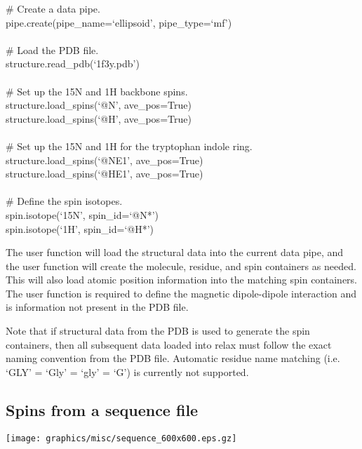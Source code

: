 \begin{exampleenv}
\# Create a data pipe. \\
pipe.create(pipe\_name=`ellipsoid', pipe\_type=`mf') \\
 \\
\# Load the PDB file. \\
structure.read\_pdb(`1f3y.pdb') \\
 \\
\# Set up the 15N and 1H backbone spins. \\
structure.load\_spins(`@N', ave\_pos=True) \\
structure.load\_spins(`@H', ave\_pos=True) \\
 \\
\# Set up the 15N and 1H for the tryptophan indole ring. \\
structure.load\_spins(`@NE1', ave\_pos=True) \\
structure.load\_spins(`@HE1', ave\_pos=True) \\
 \\
\# Define the spin isotopes. \\
spin.isotope(`15N', spin\_id=`@N*') \\
spin.isotope(`1H', spin\_id=`@H*')
\end{exampleenv}

The  user function will load the structural data into the current data pipe, and the  user function will create the molecule, residue, and spin containers as needed.  This will also load atomic position information into the matching spin containers.  The  user function is required to define the magnetic dipole-dipole interaction and is information not present in the PDB file.

Note that if structural data from the PDB is used to generate the spin containers, then all subsequent data loaded into relax must follow the exact naming convention from the PDB file.  Automatic residue name matching (i.e. `GLY' = `Gly' = `gly' = `G') is currently not supported.




\subsection{Spins from a sequence file} \label{sect: script - sequence file}

\begin{figure*}[h]
\texttt{[image: graphics/misc/sequence\_600x600.eps.gz]}
\end{figure*}

